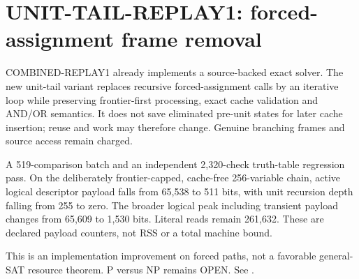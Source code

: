 \section{UNIT-TAIL-REPLAY1: forced-assignment frame removal}
COMBINED-REPLAY1 already implements a source-backed exact solver.
The new unit-tail variant replaces recursive forced-assignment calls by
an iterative loop while preserving frontier-first processing, exact
cache validation and AND/OR semantics. It does not save eliminated
pre-unit states for later cache insertion; reuse and work may therefore
change. Genuine branching frames and source access remain charged.

A 519-comparison batch and an independent 2,320-check truth-table
regression pass. On the deliberately frontier-capped, cache-free
256-variable chain, active logical descriptor payload falls from
65,538 to 511 bits, with unit recursion depth falling from 255 to zero.
The broader logical peak including transient payload changes from
65,609 to 1,530 bits. Literal reads remain 261,632.
These are declared payload counters, not RSS or a total machine bound.

This is an implementation improvement on forced paths, not a favorable
general-SAT resource theorem. P versus NP remains OPEN.
See .

